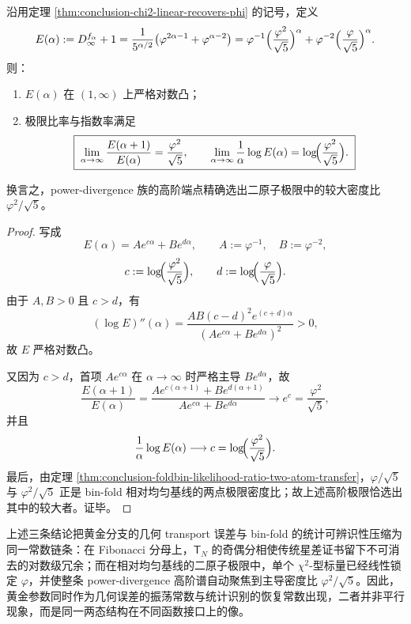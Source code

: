 \begin{proposition}\label{prop:conclusion-power-divergence-logconvex-dominant-ratio}
沿用定理 \ref{thm:conclusion-chi2-linear-recovers-phi} 的记号，定义
\[
E(\alpha):=D_\infty^{f_\alpha}+1
=
\frac{1}{5^{\alpha/2}}\bigl(\varphi^{2\alpha-1}+\varphi^{\alpha-2}\bigr)
=
\varphi^{-1}\Bigl(\frac{\varphi^2}{\sqrt5}\Bigr)^\alpha
+
\varphi^{-2}\Bigl(\frac{\varphi}{\sqrt5}\Bigr)^\alpha.
\]
则：
\begin{enumerate}
  \item \(E(\alpha)\) 在 \((1,\infty)\) 上严格对数凸；
  \item 极限比率与指数率满足
  \[
  \boxed{\;
  \lim_{\alpha\to\infty}\frac{E(\alpha+1)}{E(\alpha)}
  =
  \frac{\varphi^2}{\sqrt5},
  \qquad
  \lim_{\alpha\to\infty}\frac1\alpha\log E(\alpha)
  =
  \log\!\Bigl(\frac{\varphi^2}{\sqrt5}\Bigr).\;}
  \]
\end{enumerate}
换言之，power-divergence 族的高阶端点精确选出二原子极限中的较大密度比 \(\varphi^2/\sqrt5\)。
\end{proposition}
\begin{proof}
写成
\[
E(\alpha)=Ae^{c\alpha}+Be^{d\alpha},
\qquad
A:=\varphi^{-1},\quad B:=\varphi^{-2},
\]
\[
c:=\log\!\Bigl(\frac{\varphi^2}{\sqrt5}\Bigr),
\qquad
d:=\log\!\Bigl(\frac{\varphi}{\sqrt5}\Bigr).
\]
由于 \(A,B>0\) 且 \(c>d\)，有
\[
(\log E)''(\alpha)
=
\frac{AB(c-d)^2e^{(c+d)\alpha}}{(Ae^{c\alpha}+Be^{d\alpha})^2}>0,
\]
故 \(E\) 严格对数凸。

又因为 \(c>d\)，首项 \(Ae^{c\alpha}\) 在 \(\alpha\to\infty\) 时严格主导 \(Be^{d\alpha}\)，故
\[
\frac{E(\alpha+1)}{E(\alpha)}
=
\frac{Ae^{c(\alpha+1)}+Be^{d(\alpha+1)}}{Ae^{c\alpha}+Be^{d\alpha}}
\longrightarrow e^c
=
\frac{\varphi^2}{\sqrt5},
\]
并且
\[
\frac1\alpha\log E(\alpha)\longrightarrow c
=
\log\!\Bigl(\frac{\varphi^2}{\sqrt5}\Bigr).
\]
最后，由定理 \ref{thm:conclusion-foldbin-likelihood-ratio-two-atom-transfer}，\(\varphi/\sqrt5\) 与 \(\varphi^2/\sqrt5\) 正是 bin-fold 相对均匀基线的两点极限密度比；故上述高阶极限恰选出其中的较大者。证毕。
\end{proof}

上述三条结论把黄金分支的几何 transport 误差与 bin-fold 的统计可辨识性压缩为同一常数链条：在 Fibonacci 分母上，\(\mathsf T_N\) 的奇偶分相使传统星差证书留下不可消去的对数级冗余；而在相对均匀基线的二原子极限中，单个 \(\chi^2\)-型标量已经线性锁定 \(\varphi\)，并使整条 power-divergence 高阶谱自动聚焦到主导密度比 \(\varphi^2/\sqrt5\)。因此，黄金参数同时作为几何误差的振荡常数与统计识别的恢复常数出现，二者并非平行现象，而是同一两态结构在不同函数接口上的像。

\endinput
